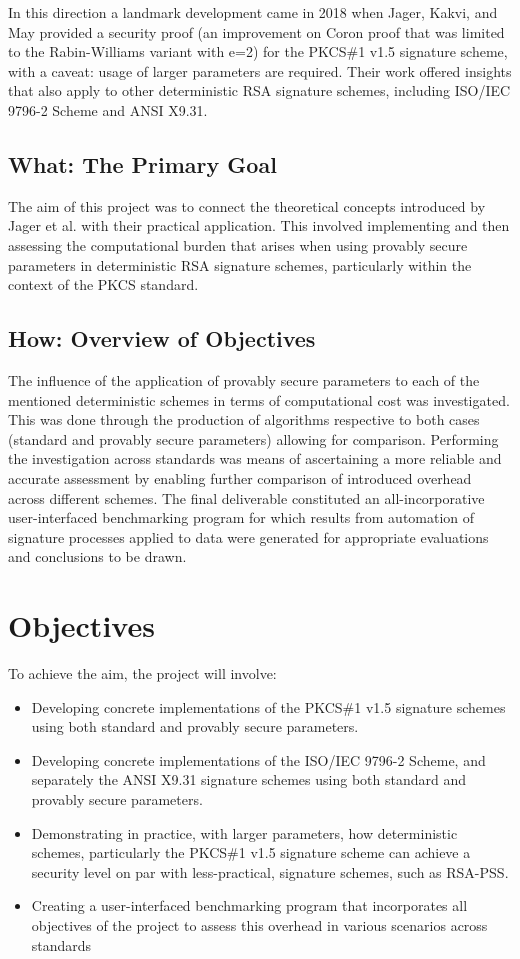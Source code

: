 \documentclass[]{final_report}
\theoremstyle{definition}
\begin{document}
In this direction a landmark development came in 2018 when Jager, Kakvi, and May \cite{jager2018security} provided a security proof (an improvement on Coron \cite{coron2002security} proof that was limited to the Rabin-Williams variant with e=2) for the PKCS\#1 v1.5 signature scheme, with a caveat: usage of larger parameters are required. Their work offered insights that also apply to other deterministic RSA signature schemes, including ISO/IEC 9796-2 Scheme and ANSI X9.31.

\subsection{What: The Primary Goal}
The aim of this project was to connect the theoretical concepts introduced by Jager et al. \cite{jager2018security} with their practical application. This involved implementing and then assessing the computational burden that arises when using provably secure parameters in deterministic RSA signature schemes, particularly within the context of the PKCS standard.

\subsection{How: Overview of Objectives}
The influence of the application of provably secure parameters to each of the mentioned deterministic schemes in terms of computational cost was investigated. This was done through the production of algorithms respective to both cases (standard and provably secure parameters) allowing for comparison. Performing the investigation across standards was means of ascertaining a more reliable and accurate assessment by enabling further comparison of introduced overhead across different schemes. The final deliverable constituted an all-incorporative user-interfaced benchmarking program for which results from automation of signature processes applied to data were generated for appropriate evaluations and conclusions to be drawn.


\section{Objectives}
To achieve the aim, the project will involve:
\begin{itemize}
    \item Developing concrete implementations of the PKCS\#1 v1.5 signature schemes using both standard and provably secure parameters.
    \item Developing concrete implementations of  the ISO/IEC 9796-2 Scheme, and separately the ANSI X9.31 signature schemes using both standard and provably secure parameters.
    \item Demonstrating in practice, with larger parameters, how deterministic schemes, particularly the PKCS\#1 v1.5 signature scheme  can achieve a security level on par with less-practical, signature schemes, such as RSA-PSS.
    \item Creating a user-interfaced benchmarking program that incorporates all objectives of the project to assess this overhead in various scenarios across standards
\end{itemize}
\end{document}
